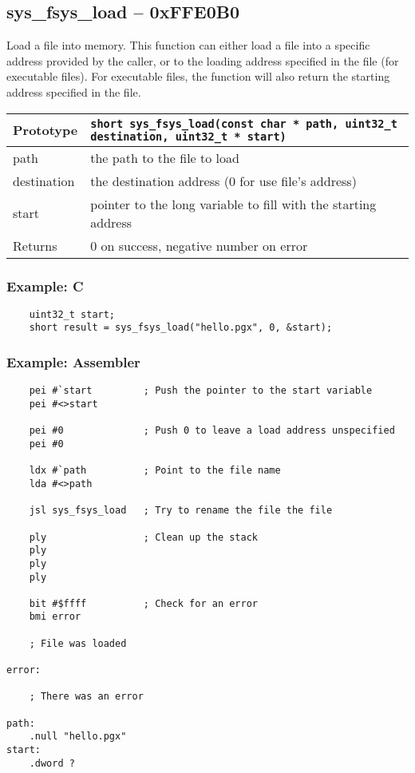 \subsection*{sys\_fsys\_load -- 0xFFE0B0}
Load a file into memory. This function can either load a file into a specific address provided by the caller,
or to the loading address specified in the file (for executable files). For executable files, the function will also
return the starting address specified in the file.

\bigskip

\begin{tabular}{|l||l|} \hline
Prototype & \lstinline!short sys_fsys_load(const char * path, uint32_t destination, uint32_t * start)! \\ \hline
path & the path to the file to load \\ \hline
destination & the destination address (0 for use file's address) \\ \hline
start & pointer to the long variable to fill with the starting address \\ \hline
Returns & 0 on success, negative number on error \\ \hline
\end{tabular}

\subsubsection*{Example: C}
\begin{lstlisting}
    uint32_t start;
    short result = sys_fsys_load("hello.pgx", 0, &start);
\end{lstlisting}

\subsubsection*{Example: Assembler}
\begin{verbatim}
    pei #`start         ; Push the pointer to the start variable
    pei #<>start

    pei #0              ; Push 0 to leave a load address unspecified
    pei #0

    ldx #`path          ; Point to the file name
    lda #<>path

    jsl sys_fsys_load   ; Try to rename the file the file

    ply                 ; Clean up the stack
    ply
    ply
    ply

    bit #$ffff          ; Check for an error
    bmi error

    ; File was loaded

error:

    ; There was an error

path:
    .null "hello.pgx"
start:
    .dword ?
\end{verbatim}


